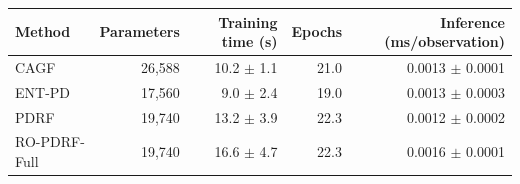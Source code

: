 \begin{tabular}{lrrrr}
\toprule
Method & Parameters & Training time (s) & Epochs & Inference (ms/observation) \\
\midrule
CAGF & 26,588 & 10.2 $\pm$ 1.1 & 21.0 & 0.0013 $\pm$ 0.0001 \\
ENT-PD & 17,560 & 9.0 $\pm$ 2.4 & 19.0 & 0.0013 $\pm$ 0.0003 \\
PDRF & 19,740 & 13.2 $\pm$ 3.9 & 22.3 & 0.0012 $\pm$ 0.0002 \\
RO-PDRF-Full & 19,740 & 16.6 $\pm$ 4.7 & 22.3 & 0.0016 $\pm$ 0.0001 \\
\bottomrule
\end{tabular}